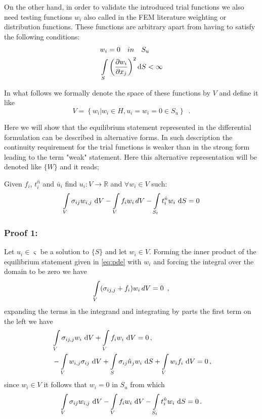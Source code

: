 On the other hand, in order to validate the introduced trial functions we also need testing functions $w_i$ also called in the FEM literature weighting or distribution functions. These functions are arbitrary apart from having to satisfy the following conditions:
\begin{align*}
&w_i = 0 \quad in \quad {S_u}\\
&\int\limits_S \left(\pdv{w_i}{x_j}\right)^2 \dd{S} < \infty
\end{align*}

In what follows we formally denote the space of these functions by $V$ and define it like
\[V = \left\{ w_i\left| w_i \in H, u_i = w_i=0 \in S_u \right. \right\} \enspace .\]

Here we will show that the equilibrium statement represented in the differential formulation can be described in alternative forms. In such description the continuity requirement for the trial functions is weaker than in the strong form leading to the term "weak" statement. Here this alternative representation will be denoted like $\{W\}$ and it reads;

Given $f_i$, $t_i^{\hat n}$ and ${\bar u_i}$ find ${u_i}:V \to \mathbb{R}$ and $\forall {w_i} \in V$ such:
\[\int\limits_V \sigma_{ij} w_{i,j}\, \dd{V} - \int\limits_V f_i w_i\, dV  - \int\limits_{S_t} t_i^{\hat n} w_i\, \dd{S} = 0\]

\subsubsection*{Proof 1:}
Let $u_i \in \varsigma $ be a solution to $\{S\}$ and let $w_i \in V $. Forming the inner product of the equilibrium statement given in \cref{eq:pde} with $w_i$ and forcing the integral over the domain to be zero we have
\[\int\limits_V (\sigma_{ij,j} + f_i ){w_i}\, dV = 0 \enspace ,\]
expanding the terms in the integrand and integrating by parts the first term on the left we have
\begin{align*}
&\int\limits_V \sigma _{ij,j} w_i\, \dd{V} + \int\limits_V f_i w_i\, \dd{V} = 0 \, ,\\
& -\int\limits_V w_{i,j} \sigma _{ij}\, \dd{V}  + \int\limits_S \sigma _{ij} \hat{n}_j w_i\, \dd{S}  + \int\limits\limits_V w_i f_i\, \dd{V} = 0\, ,
\end{align*}
since $w_i \in V$ it follows that $w_i = 0$ in $S_u$ from which
\begin{equation}\label{eq:weak}
\int\limits_V \sigma_{ij} w_{i,j}\, \dd{V} - \int\limits_V f_i w_i\, \dd{V}  - \int\limits_{S_t} t_i^{\hat n} w_i\, \dd{S} = 0\, .
\end{equation}


